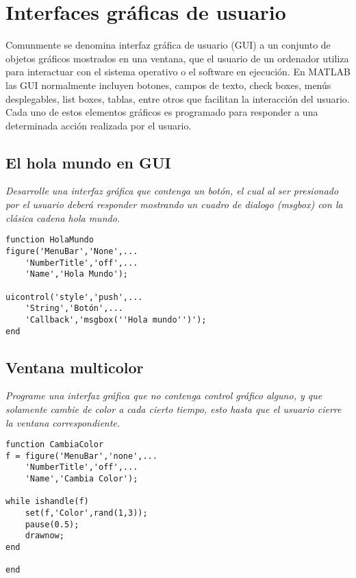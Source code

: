 \chapter{Interfaces gráficas de usuario}

Comunmente se denomina interfaz gráfica de usuario (GUI) a un conjunto de objetos gráficos mostrados en una 
ventana, que el usuario de un ordenador utiliza para interactuar con el sistema operativo o el software en 
ejecución. En MATLAB las GUI normalmente incluyen botones, campos de texto, check boxes, menús desplegables, 
list boxes, tablas, entre otros que facilitan la interacción del usuario. Cada uno de estos elementos gráficos 
es programado para responder a una determinada acción realizada por el usuario.

\section{El hola mundo en GUI}

\textit{Desarrolle una interfaz gráfica que contenga un botón, el cual al ser presionado por el usuario deberá \textit{responder} mostrando un cuadro de dialogo (msgbox) con la clásica cadena \textit{hola mundo}.}

\sol

\begin{verbatim}
function HolaMundo
figure('MenuBar','None',...
    'NumberTitle','off',...
    'Name','Hola Mundo');
 
uicontrol('style','push',...
    'String','Botón',...
    'Callback','msgbox(''Hola mundo'')');
end
\end{verbatim}

\section{Ventana multicolor}

\textit{Programe una interfaz gráfica que no contenga control gráfico alguno, y que solamente cambie de color a cada cierto tiempo, esto hasta que el usuario cierre la ventana correspondiente.}

\sol

\begin{verbatim}
function CambiaColor
f = figure('MenuBar','none',...
    'NumberTitle','off',...
    'Name','Cambia Color');
 
while ishandle(f)
    set(f,'Color',rand(1,3));
    pause(0.5);
    drawnow;
end
 
end
\end{verbatim}

